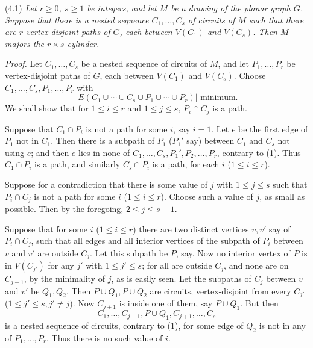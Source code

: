\stmt
(4.1) \textit{Let $r \ge 0$, $s \ge 1$ be integers, and let $M$ be a drawing of the planar graph $G$. Suppose that there is a nested sequence $C_1, \dots, C_s$ of circuits of $M$ such that there are $r$ vertex-disjoint paths of $G$, each between $V(C_1)$ and $V(C_s)$. Then $M$ majors the $r \times s$ cylinder.}

\textit{Proof.} Let $C_1, \dots, C_s$ be a nested sequence of circuits of $M$, and let $P_1, \dots, P_r$ be vertex-disjoint paths of $G$, each between $V(C_1)$ and $V(C_s)$. Choose $C_1, \dots, C_s, P_1, \dots, P_r$ with
\begin{equation*}
|E(C_1 \cup \cdots \cup C_s \cup P_1 \cup \cdots \cup P_r)| \text{ minimum.} \tag{1}
\end{equation*}
We shall show that for $1 \le i \le r$ and $1 \le j \le s$, $P_i \cap C_j$ is a path.

Suppose that $C_1 \cap P_i$ is not a path for some $i$, say $i = 1$. Let $e$ be the first edge of $P_1$ not in $C_1$. Then there is a subpath of $P_1$ ($P_1'$ say) between $C_1$ and $C_s$ not using $e$; and then $e$ lies in none of $C_1, \dots, C_s, P_1', P_2, \dots, P_r$, contrary to (1). Thus $C_1 \cap P_i$ is a path, and similarly $C_s \cap P_i$ is a path, for each $i$ ($1 \le i \le r$).

Suppose for a contradiction that there is some value of $j$ with $1 \le j \le s$ such that $P_i \cap C_j$ is not a path for some $i$ ($1 \le i \le r$). Choose such a value of $j$, as small as possible. Then by the foregoing, $2 \le j \le s - 1$.

Suppose that for some $i$ ($1 \le i \le r$) there are two distinct vertices $v, v'$ say of $P_i \cap C_j$, such that all edges and all interior vertices of the subpath of $P_i$ between $v$ and $v'$ are outside $C_j$. Let this subpath be $P$, say. Now no interior vertex of $P$ is in $V(C_{j'})$ for any $j'$ with $1 \le j' \le s$; for all are outside $C_j$, and none are on $C_{j-1}$, by the minimality of $j$, as is easily seen. Let the subpaths of $C_j$ between $v$ and $v'$ be $Q_1, Q_2$. Then $P \cup Q_1, P \cup Q_2$ are circuits, vertex-disjoint from every $C_{j'}$ ($1 \le j' \le s, j' \ne j$). Now $C_{j+1}$ is inside one of them, say $P \cup Q_1$. But then
\begin{equation*}
C_1, \dots, C_{j-1}, P \cup Q_1, C_{j+1}, \dots, C_s
\end{equation*}
is a nested sequence of circuits, contrary to (1), for some edge of $Q_2$ is not in any of $P_1, \dots, P_r$. Thus there is no such value of $i$.

